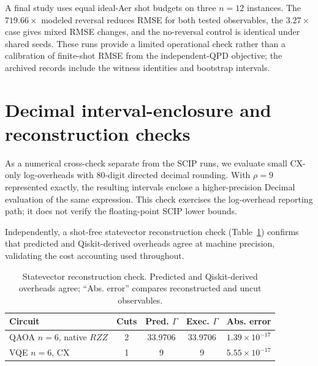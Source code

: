 \documentclass[
  aps,
  pra,
  reprint,
  amsmath,
  amssymb,
  longbibliography,
  nofootinbib,
  floatfix
]{revtex4-2}
\theoremstyle{plain}
\newcommand{\tabfit}[1]{{\footnotesize #1}}
\begin{document}
A final study uses equal ideal-Aer shot budgets on three $n=12$ instances. The $719.66\times$ modeled reversal reduces RMSE for both tested observables, the $3.27\times$ case gives mixed RMSE changes, and the no-reversal control is identical under shared seeds. These runs provide a limited operational check rather than a calibration of finite-shot RMSE from the independent-QPD objective; the archived records include the witness identities and bootstrap intervals.

\section{Decimal interval-enclosure and reconstruction checks}
\label{app:verified}

As a numerical cross-check separate from the SCIP runs, we evaluate small CX-only log-overheads with 80-digit directed decimal rounding. With $\rho=9$ represented exactly, the resulting intervals enclose a higher-precision Decimal evaluation of the same expression. This check exercises the log-overhead reporting path; it does not verify the floating-point SCIP lower bounds.

Independently, a shot-free statevector reconstruction check (Table~\ref{tab:operational}) confirms that predicted and Qiskit-derived overheads agree at machine precision, validating the cost accounting used throughout.

\begin{table}[tbp]
\centering
\caption{Statevector reconstruction check. Predicted and Qiskit-derived overheads agree; ``Abs. error'' compares reconstructed and uncut observables.}
\label{tab:operational}
\tabfit{%
\begin{tabular*}{\columnwidth}{@{\extracolsep{\fill}}lcccc@{}}
\toprule
\textbf{Circuit} & \textbf{Cuts} & \textbf{Pred. $\Gamma$} & \textbf{Exec. $\Gamma$} & \textbf{Abs. error}\\
\midrule
QAOA $n\!=\!6$, native $RZZ$ & 2 & 33.9706 & 33.9706 & $1.39\!\times\!10^{-17}$\\
VQE $n\!=\!6$, CX             & 1 & 9       & 9       & $5.55\!\times\!10^{-17}$\\
\bottomrule
\end{tabular*}
}
\end{table}



\end{document}
